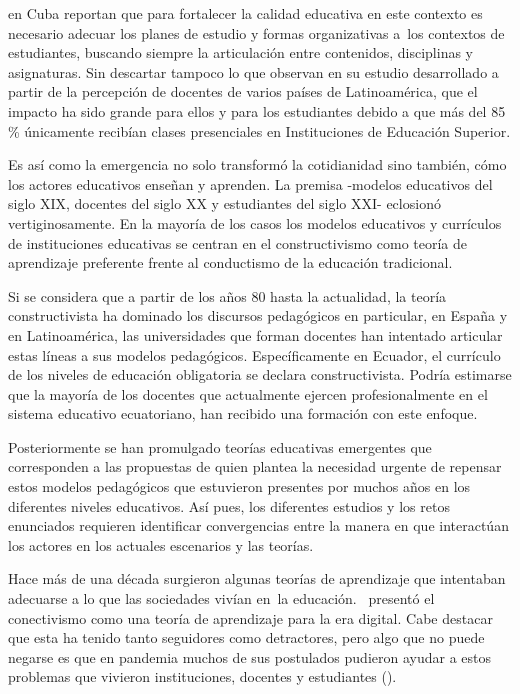 \documentclass[spanish]{textolivre}
\begin{document}
\textcite{diaz_quinones_pandemia_2020} en Cuba reportan que para fortalecer la calidad educativa en este contexto es necesario adecuar los planes de estudio y formas organizativas a los contextos de estudiantes, buscando siempre la articulación entre contenidos, disciplinas y asignaturas. Sin descartar tampoco lo que \textcite{silas_casillas_docente_2020} observan en su estudio desarrollado a partir de la percepción de docentes de varios países de Latinoamérica, que el impacto ha sido grande para ellos y para los estudiantes debido a que más del 85 \% únicamente recibían clases presenciales en Instituciones de Educación Superior.

Es así como la emergencia no solo transformó la cotidianidad sino también, cómo los actores educativos enseñan y aprenden. La premisa -modelos educativos del siglo XIX, docentes del siglo XX y estudiantes del siglo XXI- eclosionó vertiginosamente. En la mayoría de los casos los modelos educativos y currículos de instituciones educativas se centran en el constructivismo como teoría de aprendizaje preferente frente al conductismo de la educación tradicional. 

Si se considera que a partir de los años 80 hasta la actualidad, la teoría constructivista ha dominado los discursos pedagógicos en particular, en España y en Latinoamérica, las universidades que forman docentes han intentado articular estas líneas a sus modelos pedagógicos. Específicamente en Ecuador, el currículo de los niveles de educación obligatoria \cite{ministerio_de_educacion_de_ecuador_curriculo_2016} se declara constructivista. Podría estimarse que la mayoría de los docentes que actualmente ejercen profesionalmente en el sistema educativo ecuatoriano, han recibido una formación con este enfoque. 

Posteriormente se han promulgado teorías educativas emergentes que corresponden a las propuestas de \textcite{bonilla-guachamin_dos_2020} quien plantea la necesidad urgente de repensar estos modelos pedagógicos que estuvieron presentes por muchos años en los diferentes niveles educativos. Así pues, los diferentes estudios y los retos enunciados requieren identificar convergencias entre la manera en que interactúan los actores en los actuales escenarios y las teorías. 

Hace más de una década surgieron algunas teorías de aprendizaje que intentaban adecuarse a lo que las sociedades vivían en la educación. \textcite{siemens_connectivism:_2004, siemens_connectivism:_2005} presentó el conectivismo como una teoría de aprendizaje para la era digital. Cabe destacar que esta ha tenido tanto seguidores como detractores, pero algo que no puede negarse es que en pandemia muchos de sus postulados pudieron ayudar a estos problemas que vivieron instituciones, docentes y estudiantes ().
\end{document}
